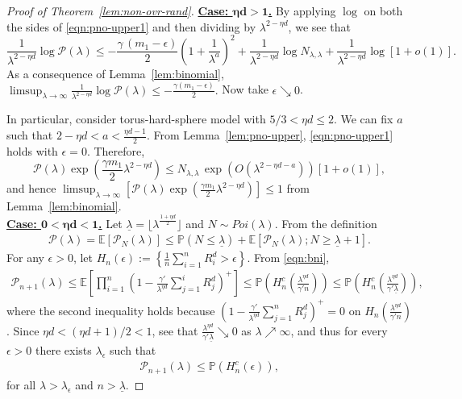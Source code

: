 \documentclass[11pt]{article}
\newcommand{\pp}{\mathbb{P}}
\newcommand{\ee}{\mathbb{E}}
\newcommand{\lt}{\left}
\newcommand{\rt}{\right}
\newcommand{\pno}{\mathcal{P}(\lambda)}
\begin{document}
\begin{appendices}
\begin{proof}[Proof of Theorem~\ref{lem:non-ovr-rand}]
\noindent
{\bf \underline{Case: $\boldsymbol{ \eta d  > 1}$.}} By applying $\log$ on both the sides of \eqref{eqn:pno-upper1} and then dividing by $\lambda^{2 -\eta d}$, we see that
\[
 \frac{1}{\lambda^{2 - \eta d}}\log \pno \leq - \frac{\gamma \, (m_1 - \epsilon)}{2}\lt(1 + \frac{1}{\lambda^a} \rt)^2 + \frac{1}{\lambda^{2 - \eta d}}\log N_{\lambda, \lambda} + \frac{1}{\lambda^{2 - \eta d}}\log [1 + o(1)].
\]
As a consequence of Lemma~\ref{lem:binomial}, $\limsup_{\lambda \rightarrow \infty} \frac{1}{\lambda^{2 - \eta d}}\log \pno \leq - \frac{\gamma(m_1 - \epsilon)}{2}.$ Now take $\epsilon \searrow 0$.

In particular, consider torus-hard-sphere model with  $5/3 < \eta d  \leq 2$.  We can fix $a$ such that $2 - \eta d < a < \frac{\eta d  - 1}{2}$. From Lemma~\ref{lem:pno-upper},
\eqref{eqn:pno-upper1} holds with $\epsilon = 0$. Therefore,
\[
 \pno \exp\lt( \frac{\gamma m_1}{2}\lambda^{2 - \eta d} \rt) \leq N_{\lambda, \lambda}\,\exp\left(  O\lt(\lambda^{2 - \eta d - a}\rt) \rt) \lt[ 1 + o(1) \rt],
\]
and hence $\limsup_{\lambda \rightarrow \infty}\lt[ \pno \exp\lt(\frac{\gamma m_1}{2}\lambda^{2 - \eta d} \rt)\rt] \leq 1$ from Lemma~\ref{lem:binomial}.\\



\noindent
{\bf \underline{Case: $\boldsymbol{0 < \eta d  < 1}$.}} Let $\underline{\lambda} = \lfloor \lambda^{\frac{1+\eta d}{2}}\rfloor$ and $N \sim Poi(\lambda)$.
From the definition
\begin{align}
\label{eqn:pno_etad_low}
\pno = \ee \lt[ \mathcal{P}_N(\lambda)\rt]  \leq \pp \lt( N \leq \underline{\lambda}\rt) + \ee \lt[ \mathcal{P}_N(\lambda) ; N \geq \underline{\lambda} + 1\rt].
\end{align}
For any $\epsilon > 0$, let $H_n(\epsilon) := \lt\{ \frac{1}{n} \sum_{i=1}^n R_i^d > \epsilon \rt\}$. From \eqref{eqn:bni},
\begin{align*}
\mathcal{P}_{n+1}(\lambda) \leq \ee\lt[\prod_{i=1}^{n} \lt(1 - \frac{\gamma'}{\lambda^{\eta d}} \sum_{j=1}^i R_j^d\rt)^+ \rt] \leq \pp\lt(H^c_n\lt( \frac{\lambda^{\eta d}}{\gamma' n}\rt) \rt) \leq \pp\lt(H^c_n\lt( \frac{\lambda^{\eta d}}{\gamma' \underline{\lambda}}\rt) \rt),
\end{align*}
where the second inequality holds because $\lt(1 - \frac{\gamma'}{\lambda^{\eta d}} \sum_{j=1}^n R_j^d\rt)^+ = 0$ on $H_n\lt( \frac{\lambda^{\eta d}}{\gamma' n}\rt)$.
Since $\eta d < (\eta d +1)/2 < 1$, see that $\frac{\lambda^{\eta d}}{\gamma' \underline{\lambda}} \searrow 0$ as $\lambda \nearrow \infty$, and thus for every $\epsilon > 0$ there exists
$\lambda_\epsilon$ such that
\begin{align*}
\mathcal{P}_{n+1}(\lambda) \leq \pp\lt(H^c_n\lt( \epsilon\rt) \rt),
\end{align*}
for all $\lambda > \lambda_\epsilon$ and $n > \underline{\lambda}$.


\end{proof}
\end{appendices}
\end{document}
